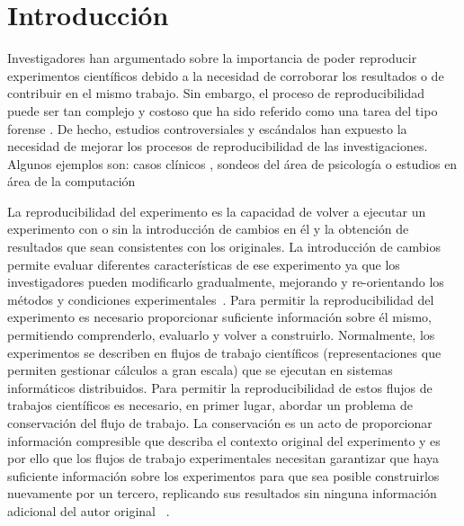 \chapter{Introducción}
\label{Chapter1} 
\newcommand{\keyword}[1]{\textbf{#1}}
\newcommand{\tabhead}[1]{\textbf{#1}}
\newcommand{\code}[1]{\texttt{#1}}
\newcommand{\file}[1]{\texttt{\bfseries#1}}
\newcommand{\option}[1]{\texttt{\itshape#1}}

Investigadores han argumentado sobre la importancia de poder reproducir experimentos científicos debido a la necesidad de corroborar los resultados o de contribuir en el mismo trabajo. 
Sin embargo, el proceso de reproducibilidad puede ser tan complejo y costoso que ha sido referido como una tarea del tipo forense \cite{baggerly2009deriving}.
De hecho, estudios controversiales y escándalos han expuesto la necesidad de mejorar los procesos de reproducibilidad de las investigaciones. Algunos ejemplos son: casos clínicos \cite{ioannidis2009repeatability}, sondeos del área de psicología \cite{open2015estimating} o estudios en área de la computación \cite{baggerly2009deriving}

La reproducibilidad del experimento es la capacidad de volver a ejecutar un experimento con o sin la introducción de cambios en él y la obtención de resultados que sean consistentes con los originales.
La introducción de cambios permite evaluar diferentes características de ese experimento ya que los investigadores pueden modificarlo gradualmente, mejorando y re-orientando los métodos y condiciones experimentales~\cite{stodden2010reproducible}.
Para permitir la reproducibilidad del experimento es necesario proporcionar suficiente información sobre él mismo, permitiendo comprenderlo, evaluarlo y volver a construirlo. Normalmente, los experimentos se describen en flujos de trabajo científicos (representaciones que permiten gestionar cálculos a gran escala) que se ejecutan en sistemas informáticos distribuidos. 
Para permitir la reproducibilidad de estos flujos de trabajos científicos es necesario, en primer lugar, abordar un problema de conservación del flujo de trabajo. 
La conservación es un acto de proporcionar información compresible que describa el contexto original del experimento  y es por ello que los flujos de trabajo experimentales necesitan garantizar que haya suficiente información sobre los experimentos para que sea posible construirlos nuevamente por un tercero, replicando sus resultados sin ninguna información adicional del autor original ~\cite{garijo2013quantifying}. 

